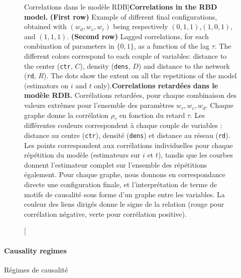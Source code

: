 \begin{figure}
\caption[Correlation in the RBD model][Correlations dans le modèle RDB]{\textbf{Correlations in the RBD model.} \textbf{(First row)} Example of different final configurations, obtained with $(w_{d},w_{c},w_{r})$ being respectively $(0,1,1)$,$(1,0,1)$, and $(1,1,1)$. \textbf{(Second row)} Lagged correlations, for each combination of parameters in $\{0,1\}$, as a function of the lag $\tau$. The different colors correspond to each couple of variables: distance to the center (\texttt{ctr}, $C$), density (\texttt{dens}, $D$) and distance to the network (\texttt{rd}, $R$). The dots show the extent on all the repetitions of the model (estimators on $i$ and $t$ only).\label{fig:causalityregimes:exrdb}}{\textbf{Correlations retardées dans le modèle RDB.} Corrélations retardées, pour chaque combinaison des valeurs extrêmes pour l'ensemble des paramètres $w_r,w_c,w_d$. Chaque graphe donne la corrélation $\rho_{\tau}$ en fonction du retard $\tau$. Les différentes couleurs correspondent à chaque couple de variables : distance au centre (\texttt{ctr}), densité (\texttt{dens}) et distance au réseau (\texttt{rd}). Les points correspondent aux corrélations individuelles pour chaque répétition du modèle (estimateurs sur $i$ et $t$), tandis que les courbes donnent l'estimateur complet sur l'ensemble des répétitions également. Pour chaque graphe, nous donnons en correspondance directe une configuration finale, et l'interprétation de terme de motifs de causalité sous forme d'un graphe entre les variables. La couleur des liens dirigés donne le signe de la relation (rouge pour corrélation négative, verte pour corrélation positive).\label{fig:causalityregimes:exrdb}}
\end{figure}







\paragraph{Causality regimes}{Régimes de causalité}

